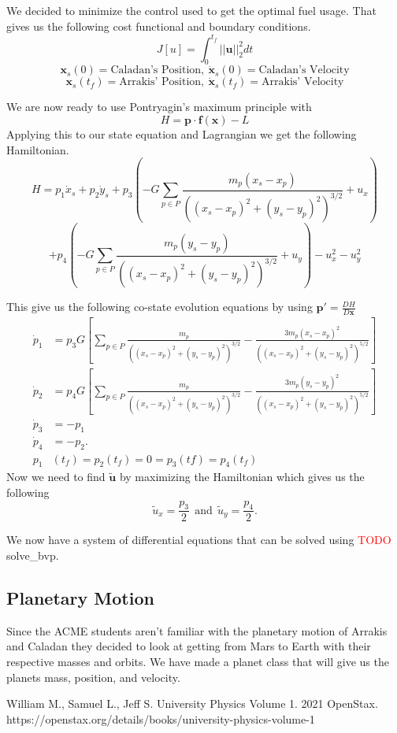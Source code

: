 \documentclass[11pt]{amsart}
\begin{document}
We decided to minimize the control used to get the optimal fuel usage. That gives us the following cost functional and boundary conditions. 
\[J[u] = \int_{0}^{t_f}||\mathbf{u}||_2^2dt\]
\[\mathbf{x}_s(0) = \text{Caladan's Position},\: \dot{\mathbf{x}}_s(0) = \text{Caladan's Velocity}\]
\[\mathbf{x}_s(t_f) = \text{Arrakis' Position},\: \dot{\mathbf{x}}_s(t_f) = \text{Arrakis' Velocity}\]

We are now ready to use Pontryagin's maximum principle with 
\[H = \mathbf{p}\cdot\mathbf{f(\mathbf{x})} - L\]
Applying this to our state equation and Lagrangian we get the following Hamiltonian.
\[H = p_1\dot{x}_s + p_2\dot{y}_s + p_3(-G\sum_{p\in{P}}^{}\frac{m_p(x_s - x_p)}{((x_s-x_p)^2+(y_s-y_p)^2)^{3/2}} + u_x)\]
\[+ p_4(-G\sum_{p\in{P}}^{}\frac{m_p(y_s - y_p)}{((x_s-x_p)^2+(y_s-y_p)^2)^{3/2}} + u_y) - u_x^2 - u_y^2\]

This give us the following co-state evolution equations by using $\mathbf{p}' = \frac{DH}{D\mathbf{x}}$
\begin{align*}
    \dot{p}_1 &= p_3G[\sum_{p\in{P}}^{}\frac{m_p}{((x_s-x_p)^2+(y_s-y_p)^2)^{3/2}} - \frac{3m_p(x_s - x_p)^2}{((x_s-x_p)^2+(y_s-y_p)^2)^{5/2}}] \\
    \dot{p}_2 &= p_4G[\sum_{p\in{P}}^{}\frac{m_p}{((x_s-x_p)^2+(y_s-y_p)^2)^{3/2}} - \frac{3m_p(y_s - y_p)^2}{((x_s-x_p)^2+(y_s-y_p)^2)^{5/2}}] \\
    \dot{p}_3 &= -p_1 \\
    \dot{p}_4 &= -p_2. \\
    p_1&(t_f)= p_2(t_f) = 0 = p_3(tf) = p_4(t_f)
\end{align*}
Now we need to find $\tilde{\mathbf{u}}$ by maximizing the Hamiltonian which gives us the following
\[\tilde{u}_x = \frac{p_3}{2} \:\:\text{and}\:\: \tilde{u}_y = \frac{p_4}{2}.\]


We now have a system of differential equations that can be solved using \textcolor{red}{TODO} solve\_bvp.

\subsection{Planetary Motion}
Since the ACME students aren't familiar with the planetary motion of Arrakis and Caladan they decided to look at getting from Mars to Earth with their respective masses and orbits.
We have made a planet class that will give us the planets mass, position, and velocity.





\FloatBarrier %
\newpage


\begin{thebibliography}{99}
 William M., Samuel L., Jeff S. University Physics Volume 1. 2021 OpenStax. https://openstax.org/details/books/university-physics-volume-1 

\end{thebibliography}
\end{document}
